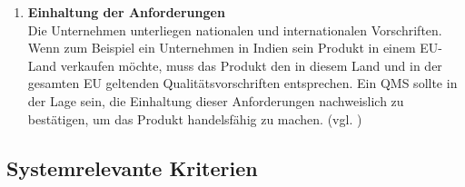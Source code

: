 \documentclass[11pt]{scrartcl}       %
\begin{document}
\begin{enumerate}
\item[] \textbf{Einhaltung der Anforderungen} \\
Die Unternehmen unterliegen nationalen und internationalen Vorschriften. Wenn zum Beispiel ein Unternehmen in Indien sein Produkt in einem EU-Land verkaufen möchte, muss das Produkt den in diesem Land und in der gesamten EU geltenden Qualitätsvorschriften entsprechen. Ein QMS sollte in der Lage sein, die Einhaltung dieser Anforderungen nachweislich zu bestätigen, um das Produkt handelsfähig zu machen. (vgl. \cite{alexandrova2020Information})

\end{enumerate}

\subsection{Systemrelevante Kriterien}
\end{document}
